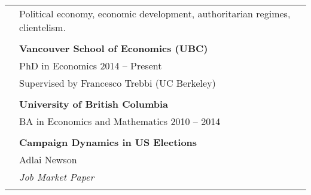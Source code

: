 \documentclass[letterpaper, 11pt]{article}
\begin{document}
\begin{longtable}{p{1.3in}p{4.8in}}


\nohyphens{\color{OliveGreen}{Research interests}}
& Political economy, economic development, authoritarian regimes, clientelism. \\
& \\


\color{OliveGreen}{Education} 
& \textbf{Vancouver School of Economics (UBC)} \hfill \\ 
& PhD in Economics \hfill  2014 -- Present \\
& Supervised by Francesco Trebbi (UC Berkeley)\\
& \\

& \textbf{University of British Columbia} \hfill  \\
& BA in Economics and Mathematics \hfill 2010 -- 2014 \\
& \\






\nohyphens{\color{OliveGreen}{Ongoing Research}}
& \textbf{Campaign Dynamics in US Elections} \\
& Adlai Newson \\
& \textit{Job Market Paper}\\
& \\


\end{longtable}
\end{document}
